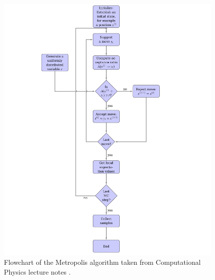 \documentclass[english,notitlepage,reprint,nofootinbib]{revtex4-1}  %
\begin{document}
\begin{figure}[H]
    \centering
    \includegraphics[width=1\textwidth]{../figures//metro_flow.pdf}
    \caption{Flowchart of the Metropolis algorithm taken from Computational Physics lecture notes \cite{compendium}.}
    \label{fig:metro_flow}
\end{figure}
\end{document}
